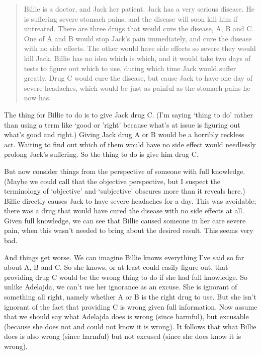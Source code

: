 \documentclass[
  10pt,
  letterpaper,
  twoside]{scrbook}
\begin{document}
\begin{quote}
{Billie} is a doctor, and {Jack} her patient. {Jack} has a very serious
disease. He is suffering severe stomach pains, and the disease will soon
kill him if untreated. There are three drugs that would cure the
disease, A, B and C. One of A and B would stop {Jack}'s pain
immediately, and cure the disease with no side effects. The other would
have side effects so severe they would kill {Jack}. {Billie} has no idea
which is which, and it would take two days of tests to figure out which
to use, during which time {Jack} would suffer greatly. Drug C would cure
the disease, but cause {Jack} to have one day of severe headaches, which
would be just as painful as the stomach pains he now has.
\end{quote}

The thing for {Billie} to do is to give {Jack} drug C. (I'm saying
`thing to do' rather than using a term like `good or 'right' because
what's at issue is figuring out what's good and right.) Giving {Jack}
drug A or B would be a horribly reckless act. Waiting to find out which
of them would have no side effect would needlessly prolong {Jack}'s
suffering. So the thing to do is give him drug C.

But now consider things from the perspective of someone with full
knowledge. (Maybe we could call that the objective perspective, but I
suspect the terminology of `objective' and `subjective' obscures more
than it reveals here.) {Billie} directly causes {Jack} to have severe
headaches for a day. This was avoidable; there was a drug that would
have cured the disease with no side effects at all. Given full
knowledge, we can see that {Billie} caused someone in her care severe
pain, when this wasn't needed to bring about the desired result. This
seems very bad.

And things get worse. We can imagine {Billie} knows everything I've said
so far about A, B and C. So she knows, or at least could easily figure
out, that providing drug C would be the wrong thing to do if she had
full knowledge. So unlike {Adelajda}, we can't use her ignorance as an
excuse. She is ignorant of something all right, namely whether A or B is
the right drug to use. But she isn't ignorant of the fact that providing
C is wrong given full information. Now assume that we should say what
{Adelajda} does is wrong (since harmful), but excusable (because she
does not and could not know it is wrong). It follows that what {Billie}
does is also wrong (since harmful) but not excused (since she does know
it is wrong).
\end{document}
